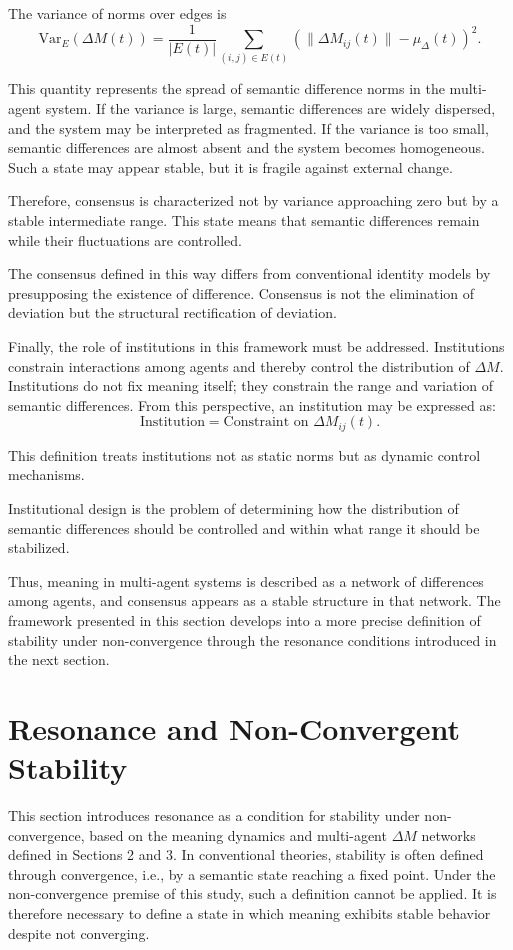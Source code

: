 \documentclass[11pt,a4paper]{article}
\theoremstyle{definition}
\begin{document}
The variance of norms over edges is
\[
\text{Var}_E(\Delta M(t)) = \frac{1}{|E(t)|} \sum_{(i,j) \in E(t)} (\|\Delta M_{ij}(t)\| - \mu_\Delta(t))^2.
\]

This quantity represents the spread of semantic difference norms in the multi-agent system. If the variance is large, semantic differences are widely dispersed, and the system may be interpreted as fragmented. If the variance is too small, semantic differences are almost absent and the system becomes homogeneous. Such a state may appear stable, but it is fragile against external change.

Therefore, consensus is characterized not by variance approaching zero but by a stable intermediate range. This state means that semantic differences remain while their fluctuations are controlled.

The consensus defined in this way differs from conventional identity models by presupposing the existence of difference. Consensus is not the elimination of deviation but the structural rectification of deviation.

Finally, the role of institutions in this framework must be addressed. Institutions constrain interactions among agents and thereby control the distribution of $\Delta M$. Institutions do not fix meaning itself; they constrain the range and variation of semantic differences. From this perspective, an institution may be expressed as:
\[
\text{Institution} = \text{Constraint on } \Delta M_{ij}(t).
\]

This definition treats institutions not as static norms but as dynamic control mechanisms.

Institutional design is the problem of determining how the distribution of semantic differences should be controlled and within what range it should be stabilized.

Thus, meaning in multi-agent systems is described as a network of differences among agents, and consensus appears as a stable structure in that network. The framework presented in this section develops into a more precise definition of stability under non-convergence through the resonance conditions introduced in the next section.

\section{Resonance and Non-Convergent Stability}

This section introduces resonance as a condition for stability under non-convergence, based on the meaning dynamics and multi-agent $\Delta M$ networks defined in Sections 2 and 3. In conventional theories, stability is often defined through convergence, i.e., by a semantic state reaching a fixed point. Under the non-convergence premise of this study, such a definition cannot be applied. It is therefore necessary to define a state in which meaning exhibits stable behavior despite not converging.
\end{document}
